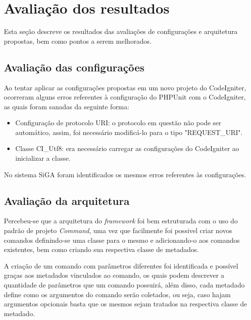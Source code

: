   \section{Avaliação dos resultados}
      Esta seção descreve os resultados das avaliações de configurações e arquitetura propostas, bem como pontos a serem melhorados.

      \subsection{Avaliação das configurações}
      
	  Ao tentar aplicar as configurações propostas em um novo projeto do CodeIgniter, ocorreram alguns erros referentes
	  à configuração do PHPUnit com o CodeIgniter, as quais foram sanadas da seguinte forma:
	  
	  \begin{itemize}

	    \item Configuração de protocolo URI: o protocolo em questão não pode ser automático, assim, foi necessário modificá-lo para
	    o tipo "REQUEST\_URI".
	    
	    \item Classe CI\_Utf8: era necessário carregar as configurações do CodeIgniter ao inicializar a classe.

	  \end{itemize}
	  
	  No sistema SiGA foram identificados os mesmos erros referentes às configurações.
      
      \subsection{Avaliação da arquitetura}
      
	  Percebeu-se que a arquitetura do \textit{framework} foi bem estruturada com o uso do padrão de projeto \textit{Command}, 
	  uma vez que facilmente foi possivel criar novos comandos definindo-se uma classe para o mesmo e adicionando-o aos comandos
	  existentes, bem como criando sua respectiva classe de metadados.
	  
	  A criação de um comando com parâmetros diferentes foi identificada e possível graças aos metadados vinculados ao comando, 
	  os quais podem descrever a quantidade de parâmetros que um comando possuirá, além disso, cada metadado define como os 
	  argumentos do comando serão coletados, ou seja, caso hajam argumentos opcionais basta que os mesmos sejam tratados na 
	  respectiva classe de metadado.
	  
